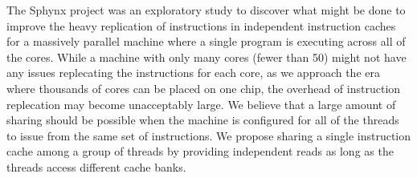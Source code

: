 The Sphynx project was an exploratory study to discover what might be
done to improve the heavy replication of instructions in independent
instruction caches for a massively parallel machine where a single
program is executing across all of the cores. 
While a machine with only many cores (fewer than 50) might not have
any issues replecating the instructions for each core, as we approach
the era where thousands of cores can be placed on one chip, the
overhead of instruction replecation may become unacceptably large.
We believe that a large amount of sharing should be possible when the
machine is configured for all of the threads to issue from the same
set of instructions.
We propose sharing a single instruction cache among a group of threads
by providing independent reads as long as the threads access different
cache banks.
